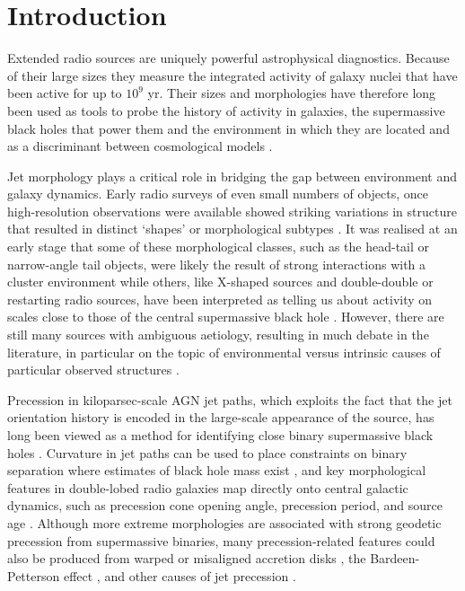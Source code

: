 \documentclass{aa}
\begin{document}
\maketitle

\section{Introduction}

Extended radio sources are uniquely powerful astrophysical diagnostics. Because of their large sizes they measure the integrated activity of galaxy nuclei that have been active for up to $10^9$ yr. Their sizes and morphologies have therefore long been used as tools to probe the history of activity in galaxies, the supermassive black holes that power them and the environment in which they are located and as a discriminant between cosmological models \citep[e.g.,][]{miley80}.

Jet morphology plays a critical role in bridging the gap between environment and galaxy dynamics. Early radio surveys of even small numbers of objects, once high-resolution observations were available showed striking variations in structure that resulted in distinct `shapes' or morphological subtypes \citep{Bridle+Perley84}. It was realised at an early stage that some of these morphological classes, such as the head-tail or narrow-angle tail objects, were likely the result of strong interactions with a cluster environment \citep[e.g.,][]{Owen+78,Jones+Owen79} while others, like X-shaped sources and double-double or restarting radio sources, have been interpreted as telling us about activity on scales close to those of the central supermassive black hole \citep[e.g.,][]{merritt02,schoenmakers00b}. However, there are still many sources with ambiguous aetiology, resulting in much debate in the literature, in particular on the topic of environmental versus intrinsic causes of particular observed structures \citep[e.g.,][]{harwood20,hardcastle19}.

Precession in kiloparsec-scale AGN jet paths, which exploits the fact that the jet orientation history is encoded in the large-scale appearance of the source, has long been viewed as a method for identifying close binary supermassive black holes \citep{gower82,krause18}. Curvature in jet paths can be used to place constraints on binary separation where estimates of black hole mass exist \citep{krause18,horton20a}, and key morphological features in double-lobed radio galaxies map directly onto central galactic dynamics, such as precession cone opening angle, precession period, and source age \citep[e.g.,][]{horton20b, horton23}. Although more extreme morphologies are associated with strong geodetic precession from supermassive binaries, many precession-related features could also be produced from warped or misaligned accretion disks \citep[e.g.,][]{fragner10,nixon13,davis20}, the Bardeen-Petterson effect \citep[e.g.,][]{caproni07}, and other causes of jet precession \citep[e.g.,][]{fragile05,stone12}. 
\end{document}
